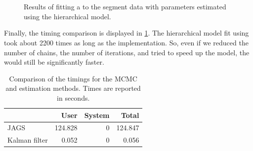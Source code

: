 \begin{knitrout}\small
{}\color{fgcolor}\begin{figure}

{\centering {}\\
\\

}

\caption[Results of fitting a \kf{} to the segment data with parameters estimated using the hierarchical model]{Results of fitting a \kf{} to the segment data with parameters estimated using the hierarchical model.}\label{fig:nw_model_n1_kf}
\end{figure}


\end{knitrout}



Finally, the timing comparison is displayed in \cref{tab:nw_model_n1_timecomp}. The hierarchical model fit using  took about 2200 times as long as the \kf{} implementation. So, even if we reduced the number of chains, the number of iterations, and tried to speed up the  model, the \kf{} would still be significantly faster.


\begin{table}

\caption[Comparison of the timings for the MCMC and \kf{} estimation methods]{\label{tab:nw_model_n1_timecomp}Comparison of the timings for the MCMC and \kf{} estimation methods. Times are reported in seconds.}
\centering
\begin{tabular}[b]{lrrr}
\toprule
  & User & System & Total\\
\midrule
JAGS & 124.828 & 0 & 124.847\\
Kalman filter & 0.052 & 0 & 0.056\\
\bottomrule
\end{tabular}
\end{table}




